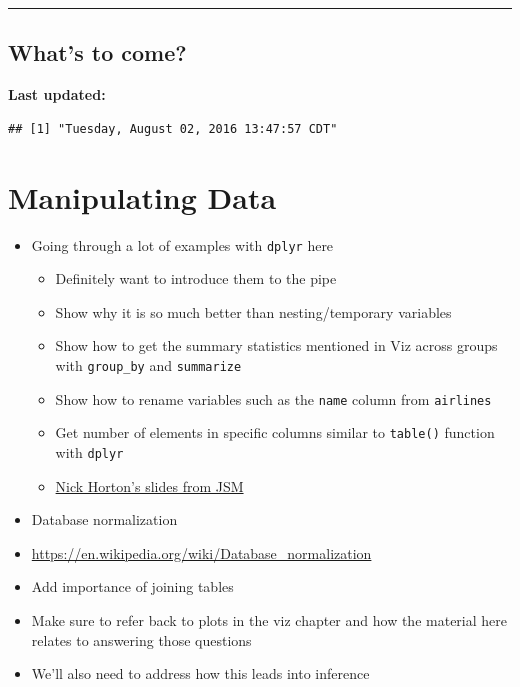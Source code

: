 \documentclass[]{tufte-book}
\providecommand{\tightlist}{%
  \setlength{\itemsep}{0pt}\setlength{\parskip}{0pt}}
\begin{document}
\begin{center}\rule{0.5\linewidth}{\linethickness}\end{center}

\section{What's to come?}\label{whats-to-come-1}

\textbf{Last updated:}

\begin{verbatim}
## [1] "Tuesday, August 02, 2016 13:47:57 CDT"
\end{verbatim}

\chapter{Manipulating Data}\label{manip}

\begin{itemize}
\tightlist
\item
  Going through a lot of examples with \texttt{dplyr} here

  \begin{itemize}
  \tightlist
  \item
    Definitely want to introduce them to the pipe
  \item
    Show why it is so much better than nesting/temporary variables
  \item
    Show how to get the summary statistics mentioned in Viz across
    groups with \texttt{group\_by} and \texttt{summarize}
  \item
    Show how to rename variables such as the \texttt{name} column from
    \texttt{airlines}
  \item
    Get number of elements in specific columns similar to
    \texttt{table()} function with \texttt{dplyr}
  \item
    \href{https://github.com/Amherst-Statistics}{Nick Horton's slides
    from JSM}
  \end{itemize}
\item
  Database normalization
\item
  \url{https://en.wikipedia.org/wiki/Database_normalization}
\item
  Add importance of joining tables
\item
  Make sure to refer back to plots in the viz chapter and how the
  material here relates to answering those questions
\item
  We'll also need to address how this leads into inference
\end{itemize}
\end{document}
